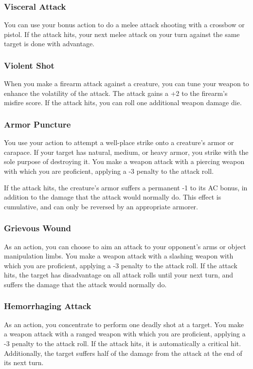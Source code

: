 \subsubsection{Visceral Attack} \label{tec::visceralattack}
You can use your bonus action to do a melee attack shooting with a crossbow or pistol.
If the attack hits, your next melee attack on your turn against the same target is done with advantage.

\subsubsection{Violent Shot} \label{tec::violentshot}
When you make a firearm attack against a creature, you can tune your weapon to enhance the volatility of the attack.
The attack gains a +2 to the firearm's misfire score.
If the attack hits, you can roll one additional weapon damage die.

\subsubsection{Armor Puncture} \label{tec::armorpuncture}
You use your action to attempt a well-place strike onto a creature's armor or carapace.
If your target has natural, medium, or heavy armor, you strike with the sole purpose of destroying it.
You make a weapon attack with a piercing weapon with which you are proficient, applying a -3 penalty to the attack roll.

If the attack hits, the creature's armor suffers a permanent -1 to its AC bonus, in addition to the damage that the attack would normally do.
This effect is cumulative, and can only be reversed by an appropriate armorer.

\subsubsection{Grievous Wound} \label{tec::grievouswound}
As an action, you can choose to aim an attack to your opponent's arms or object manipulation limbs.
You make a weapon attack with a slashing weapon with which you are proficient, applying a -3 penalty to the attack roll.
If the attack hits, the target has disadvantage on all attack rolls until your next turn, and suffers the damage that the attack would normally do.

\subsubsection{Hemorrhaging Attack} \label{tec::hemorrhagingattack}
As an action, you concentrate to perform one deadly shot at a target.
You make a weapon attack with a ranged weapon with which you are proficient, applying a -3 penalty to the attack roll.
If the attack hits, it is automatically a critical hit.
Additionally, the target suffers half of the damage from the attack at the end of its next turn.

